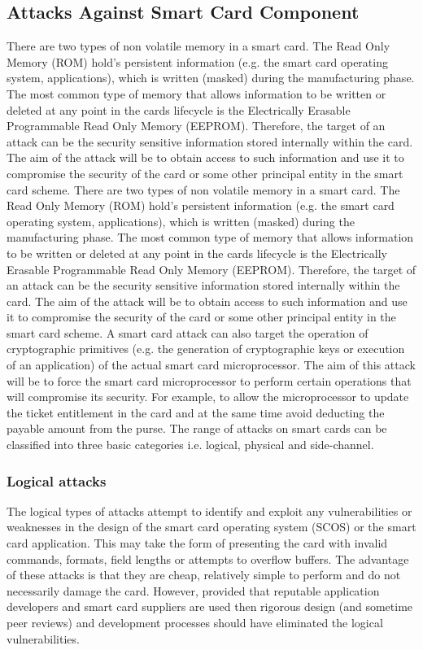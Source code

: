 \documentclass[12pt]{article}
\begin{document}
\subsection{Attacks Against Smart Card Component}
There are two types of non volatile memory in a
smart card. The Read Only Memory (ROM) hold’s
persistent information (e.g. the smart card operating
system, applications), which is written (masked) during
the manufacturing phase. The most common type of
memory that allows information to be written or
deleted at any point in the cards lifecycle is the
Electrically Erasable Programmable Read Only
Memory (EEPROM). Therefore, the target of an
attack can be the security sensitive information stored
internally within the card. The aim of the attack will
be to obtain access to such information and use it to
compromise the security of the card or some other
principal entity in the smart card scheme. \newline
There are two types of non volatile memory in a
smart card. The Read Only Memory (ROM) hold’s
persistent information (e.g. the smart card operating
system, applications), which is written (masked) during
the manufacturing phase. The most common type of
memory that allows information to be written or
deleted at any point in the cards lifecycle is the
Electrically Erasable Programmable Read Only
Memory (EEPROM). Therefore, the target of an
attack can be the security sensitive information stored
internally within the card. The aim of the attack will
be to obtain access to such information and use it to
compromise the security of the card or some other
principal entity in the smart card scheme.
A smart card attack can also target the operation of
cryptographic primitives (e.g. the generation of
cryptographic keys or execution of an application) of
the actual smart card microprocessor. The aim of this
attack will be to force the smart card microprocessor to
perform certain operations that will compromise its
security. For example, to allow the microprocessor to
update the ticket entitlement in the card and at the
same time avoid deducting the payable amount from
the purse. The range of attacks on smart cards can be
classified into three basic categories i.e. logical,
physical and side-channel.

\subsubsection{Logical attacks}
The logical types of attacks attempt to identify and
exploit any vulnerabilities or weaknesses in the design
of the smart card operating system (SCOS) or
the smart card application. This may take the form of
presenting the card with invalid commands, formats,
field lengths or attempts to overflow buffers. The
advantage of these attacks is that they are cheap,
relatively simple to perform and do not necessarily
damage the card. However, provided that reputable
application developers and smart card suppliers are
used then rigorous design (and sometime peer reviews)
and development processes should have eliminated the
logical vulnerabilities.
\end{document}
